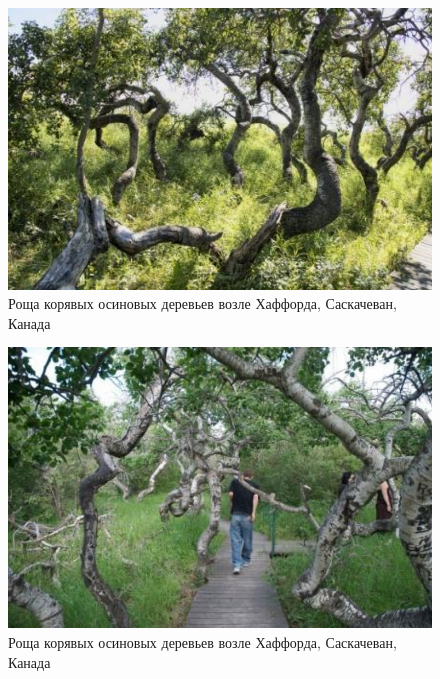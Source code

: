 \documentclass[11pt]{article}
\begin{document}
\begin{figure}[!htpb]
\centering
\includegraphics[scale=0.5]{Hoffard_1}
\caption{Роща корявых осиновых деревьев возле Хаффорда, Саскачеван, Канада}
\label{}
\end{figure}

\begin{figure}[!htpb]
\centering
\includegraphics[scale=0.5]{Hoffard_2}
\caption{Роща корявых осиновых деревьев возле Хаффорда, Саскачеван, Канада}
\label{}
\end{figure}
\end{document}
